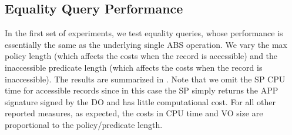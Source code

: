 \subsection{Equality Query Performance}

\begin{table}[t]
    \centering
    \caption{Equality Query Performance}\label{tab:access-control:equality-query}
\end{table}

In the first set of experiments, we test equality queries, whose performance is essentially the same as the underlying single ABS operation. We vary the max policy length (which affects the costs when the record is accessible) and the inaccessible predicate length (which affects the costs when the record is inaccessible). The results are summarized in . Note that we omit the SP CPU time for accessible records since in this case the SP simply returns the APP signature signed by the DO and has little computational cost. For all other reported measures, as expected, the costs in CPU time and VO size are proportional to the policy/predicate length.

